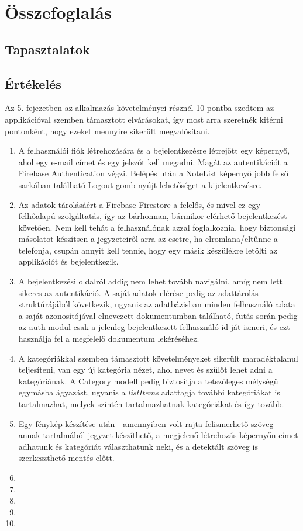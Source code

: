 \chapter{Összefoglalás}


\section{Tapasztalatok}

\section{Értékelés}

Az 5. fejezetben az alkalmazás követelményei résznél 10 pontba szedtem az applikációval szemben támasztott elvárásokat, így most arra szeretnék kitérni pontonként, hogy ezeket mennyire sikerült megvalósítani.

\begin{enumerate}
	\item A felhasználói fiók létrehozására és a bejelentkezésre létrejött egy képernyő, ahol egy e-mail címet és egy jelszót kell megadni. Magát az autentikációt a Firebase Authentication végzi. Belépés után a NoteList képernyő jobb felső sarkában található Logout gomb nyújt lehetőséget a kijelentkezésre.
	\item Az adatok tárolásáért a Firebase Firestore a felelős, és mivel ez egy felhőalapú szolgáltatás, így az bárhonnan, bármikor elérhető bejelentkezést követően. Nem kell tehát a felhasználónak azzal foglalkoznia, hogy biztonsági másolatot készítsen a jegyzeteiről arra az esetre, ha elromlana/eltűnne a telefonja, csupán annyit kell tennie, hogy egy másik készülékre letölti az applikációt és bejelentkezik.
	\item A bejelentkezési oldalról addig nem lehet tovább navigálni, amíg nem lett sikeres az autentikáció. A saját adatok elérése pedig az adattárolás struktúrájából következik, ugyanis az adatbázisban minden felhasználó adata a saját azonosítójával elnevezett dokumentumban található, futás során pedig az auth modul csak a jelenleg bejelentkezett felhasználó id-ját ismeri, és ezt használja fel a megfelelő dokumentum lekéréséhez. 
	\item A kategóriákkal szemben támasztott követelményeket sikerült maradéktalanul teljesíteni, van egy új kategória nézet, ahol nevet és szülőt lehet adni a kategóriának. A Category modell pedig biztosítja a tetszőleges mélységű egymásba ágyazást, ugyanis a \emph{listItems} adattagja további kategóriákat is tartalmazhat, melyek szintén tartalmazhatnak kategóriákat és így tovább. 
	\item Egy fénykép készítése után - amennyiben volt rajta felismerhető szöveg - annak tartalmából jegyzet készíthető, a megjelenő létrehozás képernyőn címet adhatunk és kategóriát választhatunk neki, és a detektált szöveg is szerkeszthető mentés előtt. 
	\item 
	\item
	\item
	\item
	\item
\end{enumerate}

